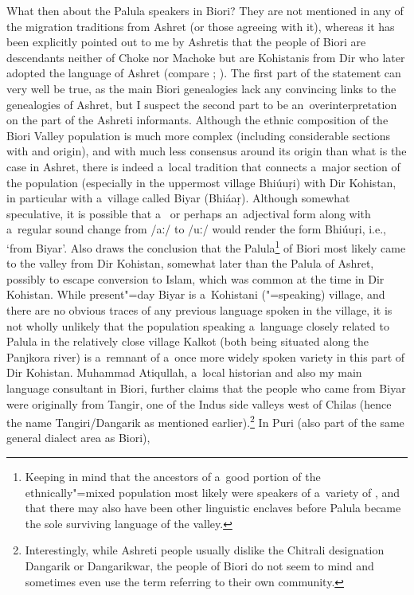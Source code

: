What then about the Palula speakers in Biori? They are not mentioned in any of the migration
traditions from Ashret (or those agreeing with it), whereas it has been explicitly pointed out to me
by Ashretis that the people of Biori are descendants neither of Choke nor Machoke but are Kohistanis
from Dir who later adopted the language of Ashret (compare \citealt[255]{strand2001};
\citealt[296]{saeed2001}). The first part of the statement can very well be true, as the main Biori
genealogies lack any convincing links to the genealogies of Ashret, but I suspect the second part to
be an~overinterpretation on the part of the Ashreti informants. Although the ethnic composition of
the Biori Valley population is much more complex (including considerable sections with \iliKalasha and
\iliNuristani origin), and with much less consensus around its origin than what is the case in Ashret,
there is indeed a~local tradition that connects a~major section of the population (especially in the
uppermost village Bhiúuṛi) with Dir Kohistan, in particular with a~village called Biyar
(Bhiáaṛ). Although somewhat speculative, it is possible that a~ or perhaps an~adjectival
form along with a~regular sound change from ‌/aː/ to /uː/ would render the form Bhiúuṛi,
i.e., `from Biyar'. Also \citet[111--108]{cacopardo2001} draws the conclusion that the
Palula\footnote{Keeping in mind that the ancestors of a~good portion of the ethnically"=mixed
  population most likely were speakers of a~variety of \iliKalasha, and that there may also have been
  other linguistic enclaves before Palula became the sole surviving language of the valley.} of
Biori most likely came to the valley from Dir Kohistan, somewhat later than the Palula of Ashret,
possibly to escape conversion to Islam, which was common at the time in Dir Kohistan. While
present"=day Biyar is a~Kohistani (\iliGawri"=speaking) village, and there are no obvious traces of any
previous language spoken in the village, it is not wholly unlikely that the population speaking
a~language closely related to Palula in the relatively close village Kalkot (both being situated
along the Panjkora river) is a~remnant of a~once more widely spoken \iliShina variety in this part of
Dir Kohistan. Muhammad Atiqullah, a~local historian and also my main language consultant in Biori, further
claims that the people who came from Biyar were originally from Tangir, one of the Indus side
valleys west of Chilas (hence the name Tangiri/Dangarik as mentioned
earlier).\footnote{Interestingly, while Ashreti people usually dislike the Chitrali designation
  Dangarik or Dangarikwar, the people of Biori do not seem to mind and sometimes even use the term
  referring to their own community.} In Puri (also part of the same general dialect area as Biori),
